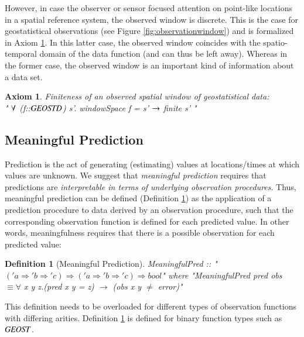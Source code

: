 \documentclass[final,authoryear,1p,times]{elsarticle}
\newtheorem{Axiom}{Axiom}
\newtheorem{definition}{Definition}
\begin{document}
However, in case the observer or sensor focused attention on point-like locations in a spatial reference system, the observed window is discrete. This is the case for geostatistical observations (see Figure \ref{fig:observationwindow}) and is formalized in Axiom \ref{ax:finiteGEOSTW}. In this latter case, the observed window coincides with the spatio-temporal domain of the data function (and can thus be left away). Whereas in the former case, the observed window is an important kind of information about a data set.

\begin{Axiom}
Finiteness of an observed spatial window of geostatistical data:\\
 " ${\it\forall}$ (f::${\it GEOSTD}$) s'. windowSpace f  = s' ${\it \rightarrow}$ finite s' "
\label{ax:finiteGEOSTW}
\end{Axiom}

\subsection{Meaningful Prediction}
\label{prediction}

Prediction is the act of generating (estimating) values at locations/times at which values are unknown. We suggest that \textit{meaningful prediction} requires that predictions are \textit{interpretable in terms of underlying observation procedures}. Thus, meaningful prediction can be defined (Definition \ref{def:meaningfulPred}) as the application of a prediction procedure to data derived by an observation procedure, such that the corresponding observation function is defined for each predicted value. In other words, meaningfulness requires that there is a possible observation for each predicted value:

\begin{definition}[Meaningful Prediction]
\label{def:meaningfulPred}
 MeaningfulPred :: "$('a \Rightarrow 'b \Rightarrow 'c) \Rightarrow ('a \Rightarrow 'b \Rightarrow 'c) \Rightarrow bool$" where 
 "MeaningfulPred pred obs  $\equiv \forall$  x y z.(pred  x y  = z) $\rightarrow$ (obs x y $\neq$ error)"
\end{definition}

This definition needs to be overloaded for different types of observation functions with differing arities. Definition \ref{def:meaningfulPred} is defined for binary function types such as $\it{GEOST}$. 
\end{document}
